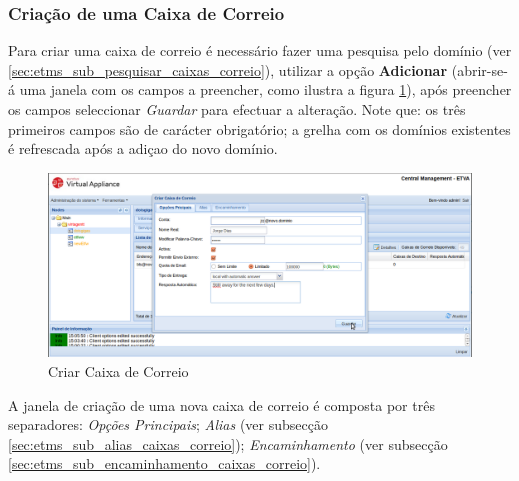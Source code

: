 \subsubsection{Criação de uma Caixa de Correio}
\label{sec:etms_sub_criar_caixas_correio}
Para criar uma caixa de correio é necessário fazer uma pesquisa pelo domínio (ver \ref{sec:etms_sub_pesquisar_caixas_correio}), utilizar a opção \textbf{Adicionar} (abrir-se-á uma janela com os campos a preencher, como ilustra a figura \ref{fig:etms_criar_mailbox}), após preencher os campos seleccionar \textit{Guardar} para efectuar a alteração. Note que: os três primeiros campos são de carácter obrigatório; a grelha com os domínios existentes é refrescada após a adiçao do novo domínio.

\begin{figure}[H]
    \begin{center}
    \includegraphics[scale=0.35]{screenshots/etms/etms_criar_mailbox.png}
    \caption{Criar Caixa de Correio}
    \label{fig:etms_criar_mailbox}
    \end{center}
\end{figure}

A janela de criação de uma nova caixa de correio é composta por três separadores: \textit{Opções Principais}; \textit{Alias} (ver subsecção \ref{sec:etms_sub_alias_caixas_correio}); \textit{Encaminhamento} (ver subsecção \ref{sec:etms_sub_encaminhamento_caixas_correio}).

